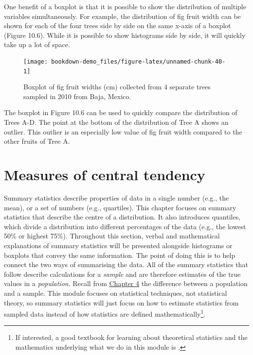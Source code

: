 \documentclass[
]{scrbook}
\begin{document}
One benefit of a boxplot is that it is possible to show the distribution of multiple variables simultaneously.
For example, the distribution of fig fruit width can be shown for each of the four trees side by side on the same x-axis of a boxplot (Figure 10.6).
While it is possible to show histograms side by side, it will quickly take up a lot of space.

\begin{figure}
\texttt{[image: bookdown-demo\_files/figure-latex/unnamed-chunk-40-1]} \caption{Boxplot of fig fruit widths (cm) collected from 4 separate trees sampled in 2010 from Baja, Mexico.}\label{fig:unnamed-chunk-40}
\end{figure}

The boxplot in Figure 10.6 can be used to quickly compare the distribution of Trees A-D.
The point at the bottom of the distribution of Tree A shows an outlier.
This outlier is an especially low value of fig fruit width compared to the other fruits of Tree A.

\hypertarget{Chapter_11}{%
\chapter{Measures of central tendency}\label{Chapter_11}}

Summary statistics describe properties of data in a single number (e.g., the mean), or a set of numbers (e.g., quartiles).
This chapter focuses on summary statistics that describe the centre of a distribution.
It also introduces quantiles, which divide a distribution into different percentages of the data (e.g., the lowest 50\% or highest 75\%).
Throughout this section, verbal and mathematical explanations of summary statistics will be presented alongside histograms or boxplots that convey the same information.
The point of doing this is to help connect the two ways of summarising the data.
All of the summary statistics that follow describe calculations for a \emph{sample} and are therefore estimates of the true values in a \emph{population}.
Recall from \protect\hyperlink{Chapter_4}{Chapter 4} the difference between a population and a sample.
This module focuses on statistical techniques, not statistical theory, so summary statistics will just focus on how to estimate statistics from sampled data instead of how statistics are defined mathematically\footnote{If interested, a good textbook for learning about theoretical statistics and the mathematics underlying what we do in this module is \citet{Miller2004}.}.
\end{document}
